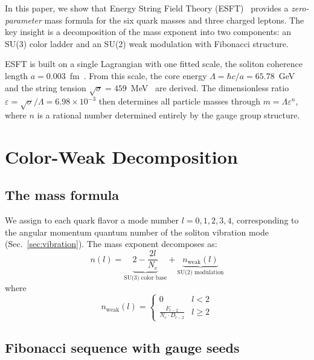 ﻿\documentclass[twocolumn,preprintnumbers,amsmath,amssymb,prd]{revtex4-2}
\newcommand{\koppa}{\text{\usefont{T1}{lmr}{m}{n}\symbol{"DE}}}%
\renewcommand{\koppa}{a}%
\begin{document}
In this paper, we show that Energy String Field Theory (ESFT)~\cite{Paper1,Paper2,Paper3} provides a \emph{zero-parameter} mass formula for the six quark masses and three charged leptons. The key insight is a decomposition of the mass exponent into two components: an SU(3) color ladder and an SU(2) weak modulation with Fibonacci structure.

ESFT is built on a single Lagrangian with one fitted scale, the soliton coherence length $\koppa = 0.003$~fm~\cite{Paper1}. From this scale, the core energy $\Lambda = \hbar c/\koppa = 65.78$~GeV and the string tension $\sqrt{\sigma} = 459$~MeV~\cite{Paper2} are derived. The dimensionless ratio $\varepsilon = \sqrt{\sigma}/\Lambda = 6.98 \times 10^{-3}$ then determines all particle masses through $m = \Lambda\varepsilon^n$, where $n$ is a rational number determined entirely by the gauge group structure.

\section{Color-Weak Decomposition}
\label{sec:decomposition}

\subsection{The mass formula}

We assign to each quark flavor a mode number $l = 0, 1, 2, 3, 4$, corresponding to the angular momentum quantum number of the soliton vibration mode (Sec.~\ref{sec:vibration}). The mass exponent decomposes as:
\begin{equation}
\boxed{n(l) = \underbrace{2 - \frac{2l}{N_c}}_{\text{SU(3) color base}} + \underbrace{n_{\text{weak}}(l)}_{\text{SU(2) modulation}}}
\label{eq:master}
\end{equation}
where
\begin{equation}
n_{\text{weak}}(l) = \begin{cases} 0 & l < 2 \\ \displaystyle\frac{F_{l-2}}{N_c \cdot D_{l-2}} & l \geq 2 \end{cases}
\label{eq:nweak}
\end{equation}

\subsection{Fibonacci sequence with gauge seeds}
\end{document}
